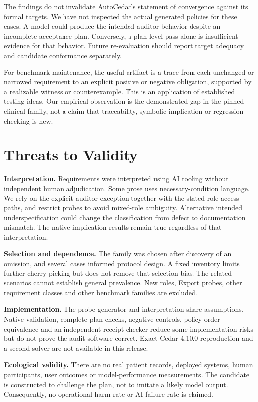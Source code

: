 \documentclass[sigconf,nonacm]{acmart}
\begin{document}
The findings do not invalidate AutoCedar's statement of convergence against its formal targets. We have not inspected the actual generated policies for these cases. A model could produce the intended auditor behavior despite an incomplete acceptance plan. Conversely, a plan-level pass alone is insufficient evidence for that behavior. Future re-evaluation should report target adequacy and candidate conformance separately.

For benchmark maintenance, the useful artifact is a trace from each unchanged or narrowed requirement to an explicit positive or negative obligation, supported by a realizable witness or counterexample. This is an application of established testing ideas. Our empirical observation is the demonstrated gap in the pinned clinical family, not a claim that traceability, symbolic implication or regression checking is new.

\section{Threats to Validity}
\textbf{Interpretation.} Requirements were interpreted using AI tooling without independent human adjudication. Some prose uses necessary-condition language. We rely on the explicit auditor exception together with the stated role access paths, and restrict probes to avoid mixed-role ambiguity. Alternative intended underspecification could change the classification from defect to documentation mismatch. The native implication results remain true regardless of that interpretation.

\textbf{Selection and dependence.} The family was chosen after discovery of an omission, and several cases informed protocol design. A fixed inventory limits further cherry-picking but does not remove that selection bias. The related scenarios cannot establish general prevalence. New roles, Export probes, other requirement classes and other benchmark families are excluded.

\textbf{Implementation.} The probe generator and interpretation share assumptions. Native validation, complete-plan checks, negative controls, policy-order equivalence and an independent receipt checker reduce some implementation risks but do not prove the audit software correct. Exact Cedar 4.10.0 reproduction and a second solver are not available in this release.

\textbf{Ecological validity.} There are no real patient records, deployed systems, human participants, user outcomes or model-performance measurements. The candidate is constructed to challenge the plan, not to imitate a likely model output. Consequently, no operational harm rate or AI failure rate is claimed.
\end{document}
